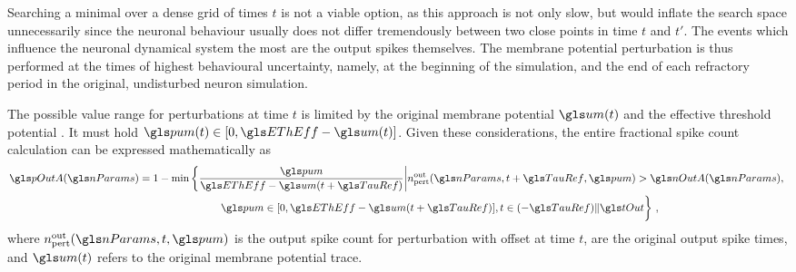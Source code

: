 Searching a minimal \pum over a dense grid of times $t$ is not a viable option, as this approach is not only slow, but would inflate the search space unnecessarily since the neuronal behaviour usually does not differ tremendously between two close points in time $t$ and $t'$. The events which influence the neuronal dynamical system the most are the output spikes themselves. The membrane potential perturbation is thus performed at the times of highest behavioural uncertainty, namely, at the beginning of the simulation, and the end of each refractory period in the original, undisturbed neuron simulation.

The possible value range for perturbations at time $t$ is limited by the original membrane potential $\um(t)$ and the effective threshold potential \EThEff. It must hold $\pum(t) \in [0, \EThEff - \um(t)]$. Given these considerations, the entire fractional spike count calculation can be expressed mathematically as
\begin{align}
	\pOutA(\nParams) &= 1 - \min\left\{ \frac{\pum}{\EThEff - \um(t + \TauRef)} \middle| n^\mathrm{out}_\mathrm{pert}(\nParams, t + \TauRef, \pum) > \nOutA(\nParams), \right. \notag\\
	&\left. \phantom{\frac{\pum}{\EThEff}} \quad \pum \in [0, \EThEff - \um(t + \TauRef)], t \in (-\TauRef) \Arrowvert \tOut \right\} \,,
	\label{eqn:mmpp}
\end{align}
where $n^\mathrm{out}_\mathrm{pert}(\nParams, t, \pum)$ is the output spike count for perturbation with offset \pum at time $t$, \tOut are the original output spike times, and $\um(t)$ refers to the original membrane potential trace.

